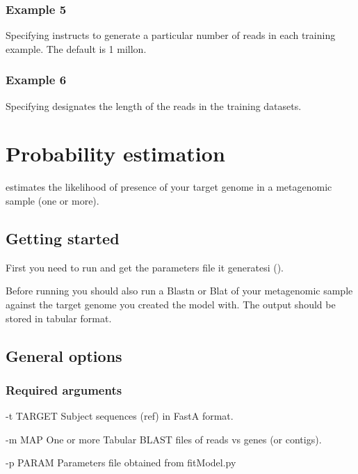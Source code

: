 \documentclass[letterpaper,10pt,english]{sphinxmanual}
\begin{document}
\subsubsection{Example 5}
\label{fitModel:example-5}

Specifying  instructs  to generate a particular number of reads in each training example. The  default is 1 millon.


\subsubsection{Example 6}
\label{fitModel:example-6}

Specifying  designates the length of the reads in the training datasets.


\section{Probability estimation}
\label{probEstimate:probability-estimation}\label{probEstimate::doc}
 estimates the likelihood of presence of your target genome in a metagenomic sample (one or more).


\subsection{Getting started}
\label{probEstimate:getting-started}
First you need to run  and get the parameters file it generatesi ().

Before running  you should also run a Blastn or Blat of your metagenomic sample against the target genome you created the model with. The output should be stored in tabular format.


\subsection{General options}
\label{probEstimate:general-options}

\subsubsection{Required arguments}
\label{probEstimate:required-arguments}\begin{optionlist}{3cm}
\item [-t TARGET]  
Subject sequences (ref) in FastA format.
\item [-m MAP]  
One or more Tabular BLAST files of reads vs genes (or contigs).
\item [-p PARAM]  
Parameters file obtained from fitModel.py
\end{optionlist}
\end{document}
